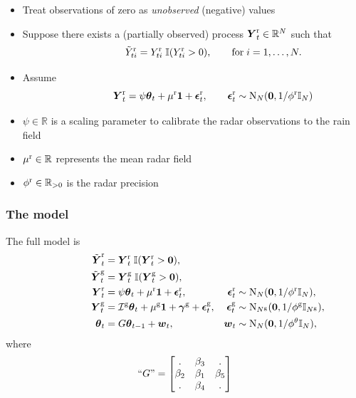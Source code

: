 \begin{frame}
\begin{itemize}
\item Treat observations of zero as \textit{unobserved} (negative) values
\bigskip
\item Suppose there exists a (partially observed) process $\boldsymbol{Y}_t^{\text{r}} \in \mathbb{R}^N$ such that
\begin{equation*}
\qquad \qquad \tilde{Y}_{ti}^{\text{r}} = Y_{ti}^{\text{r}}  \; \mathbb{I}(Y_{ti}^{\text{r}} > 0), \qquad \text{for} \; i=1,\dots,N.
\end{equation*}
\item Assume
\begin{equation*}
\qquad  \qquad  \boldsymbol{Y}_t^{\text{r}} = \psi \boldsymbol{\theta}_t + \mu^{\text{r}} \boldsymbol{1} + \boldsymbol{\epsilon}^{\text{r}}_t,    \qquad \boldsymbol{\epsilon}^{\text{r}}_t \sim \text{N}_N(\boldsymbol{0},1/{\phi^\text{r}} {\mathbb{I}_{N}} )
\end{equation*}
\item $\psi \in \mathbb{R}$ is a scaling parameter to calibrate the radar observations to the rain field
\medskip
\item $\mu^{\text{r}} \in \mathbb{R}$ represents the mean radar field
\medskip
\item ${\phi^\text{r}} \in \mathbb{R}_{>0}$ is the radar precision
\end{itemize}
\end{frame}


\begin{frame}
\frametitle{The model}
The full model is
\begin{align*}
\hspace{2cm} \tilde{\boldsymbol{Y}}_{t}^{\text{r}} &= \boldsymbol{Y}_{t}^{\text{r}}  \; \mathbb{I}(\boldsymbol{Y}_{t}^{\text{r}} > \boldsymbol{0}), \\
 \tilde{\boldsymbol{Y}}_{t}^{\text{g}} &= \boldsymbol{Y}_{t}^{\text{g}}  \; \mathbb{I}(\boldsymbol{Y}_{t}^{\text{g}} > \boldsymbol{0}), \\
{\boldsymbol{Y}^\text{r}_t} &= \psi \boldsymbol{\theta}_t + \mu^{\text{r}} \boldsymbol{1} + \boldsymbol{\epsilon}^{\text{r}}_t,   & \boldsymbol{\epsilon}^{\text{r}}_t &\sim \text{N}_N(\boldsymbol{0},1/{\phi^\text{r}} {\mathbb{I}_{N}} ), \\
{\boldsymbol{Y}^\text{g}_t} &= \mathcal{I}^{\text{g}} \boldsymbol{\theta}_t + \mu^{\text{g}} \boldsymbol{1} + \boldsymbol{\gamma}^{\text{g}} + \boldsymbol{\epsilon}^{\text{g}}_t,  &\boldsymbol{\epsilon}^{{\text{g}}}_t &\sim \text{N}_{N^\text{g}}(\boldsymbol{0},1/{\phi^\text{g}} {\mathbb{I}_{N^\text{g}}} ), \\
\boldsymbol{\theta}_t &= G\boldsymbol{\theta}_{t-1} + \boldsymbol{w}_t, & \boldsymbol{w}_t &\sim \text{N}_{N}(\boldsymbol{0},1/\phi^\theta {\mathbb{I}_{N}}),
\end{align*}
\bigskip
where
\begin{equation*}
``G" =  \begin{bmatrix}
. & \beta_3 & .\\
\beta_2 & \beta_1 & \beta_5\\
. & \beta_4 & .\\
\end{bmatrix}
\end{equation*}
\end{frame}

